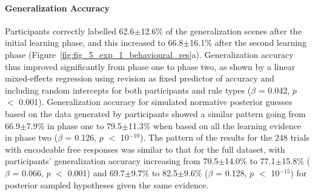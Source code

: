 \documentclass[doc,natbib,floatsintext]{apa7}
\begin{document}
\paragraph{Generalization Accuracy}
Participants correctly labelled 62.6$\pm$12.6\% of the generalization scenes after the initial learning phase, and this increased to 66.8$\pm$16.1\% after the second learning phase (Figure~\ref{fig:fig_5_exp_1_behavioural_res}a). Generalization accuracy thus improved significantly from phase one to phase two, as shown by a linear mixed-effects regression using revision as fixed predictor of accuracy and including random intercepts for both participants and rule types ($\beta$ =  0.042, $p$ $<$ 0.001). Generalization accuracy for simulated normative posterior guesses based on the data generated by participants showed a similar pattern going from 66.9$\pm$7.9\% in phase one to 79.5$\pm$11.3\% when based on all the learning evidence in phase two ($\beta$ = 0.126, $p$ $<$ 10$^{-10}$). The pattern of the results for the 248 trials with encodeable free responses was similar to that for the full dataset, with participants' generalization accuracy increasing from 70.5$\pm$14.0\% to 77.1$\pm$15.8\% ($\beta$ = 0.066, $p$ $<$ 0.001) and 69.7$\pm$9.7\% to 82.5$\pm$9.6\% ($\beta$  = 0.128, $p$ $<$ 10$^{-15}$) for posterior sampled hypotheses given the same evidence. %
\end{document}
